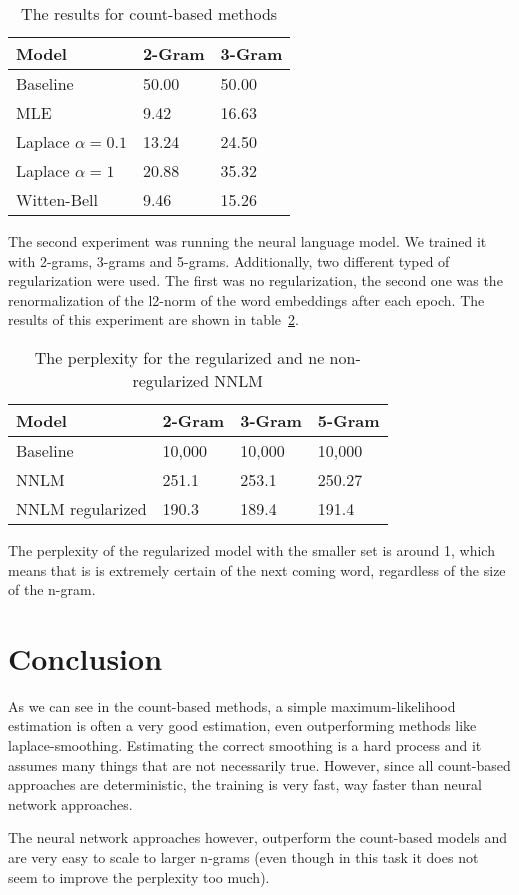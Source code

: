 \documentclass[11pt]{article}
\begin{document}
\begin{table}[ht]
\centering
\begin{tabular}{@{}lll@{}}
\toprule
Model                & 2-Gram & 3-Gram \\ \midrule
Baseline             & 50.00  & 50.00  \\ \midrule
MLE                  & 9.42   & 16.63  \\
Laplace $\alpha=0.1$ & 13.24  & 24.50  \\
Laplace $\alpha=1$   & 20.88  & 35.32  \\
Witten-Bell          & 9.46  & 15.26 
\end{tabular}
\caption{The results for count-based methods}
\label{tab:count}
\end{table}

The second experiment was running the neural language model. We trained it with 2-grams, 3-grams and 5-grams. Additionally, two different typed of regularization were used. The first was no regularization, the second one was the renormalization of the l2-norm of the word embeddings after each epoch. The results of this experiment are shown in table~\ref{tab:nn}.

\begin{table}[ht]
\centering
\begin{tabular}{@{}llll@{}}
\toprule
Model            & 2-Gram & 3-Gram & 5-Gram \\ \midrule
Baseline         & 10,000 & 10,000 & 10,000 \\ \midrule
NNLM             & 251.1  & 253.1  & 250.27 \\
NNLM regularized & 190.3  & 189.4  & 191.4  \\ \bottomrule
\end{tabular}
\caption{The perplexity for the regularized and ne non-regularized NNLM}
\label{tab:nn}
\end{table}

The perplexity of the regularized model with the smaller set is around 1, which means that is is extremely certain of the next coming word, regardless of the size of the n-gram.


\section{Conclusion}

As we can see in the count-based methods, a simple maximum-likelihood estimation is often a very good estimation, even outperforming methods like laplace-smoothing. Estimating the correct smoothing is a hard process and it assumes many things that are not necessarily true. However, since all count-based approaches are deterministic, the training is very fast, way faster than neural network approaches. 

The neural network approaches however, outperform the count-based models and are very easy to scale to larger n-grams (even though in this task it does not seem to improve the perplexity too much).




\end{document}
